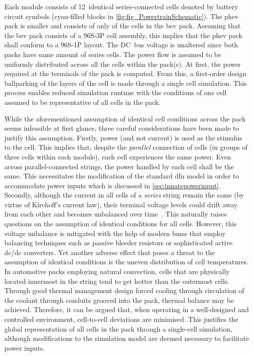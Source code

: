 Each module consists  of 12~identical series-connected cells  denoted by battery
circuit symbols (cyan-filled  blocks in \cref{fig:fig_PowertrainSchematic}). The
\gls{phev} pack is  smaller and consists of only   of the cells in
the \gls{bev} pack. Assuming that the \gls{bev} pack consists of a \mbox{96S-3P}
cell  assembly,  this implies  that  the  \gls{phev}  pack  shall conform  to  a
\mbox{96S-1P} layout. The DC~bus voltage is unaltered since both packs have same
amount of  series cells. The power  flow is assumed to  be uniformly distributed
across all  the cells within  the pack(s). At first,  the power required  at the
terminals of the  pack is computed. From this, a  first-order design ballparking
of the layers of the cell is made through a single cell simulation. This process
enables reduced simulation runtime with the conditions of one cell assumed to be
representative of all cells in the pack.



While the aforementioned assumption of identical cell conditions across the pack
seems infeasible at first glance, three careful considerations have been made to
justify  this assumption.  Firstly,  power  (and not  current)  is  used as  the
stimulus to the cell. This  implies that, despite the \emph{parallel} connection
of cells  (in groups of three  cells within each module),  each cell experiences
the same  power. Even  across parallel-connected strings,  the power  handled by
each cell shall be the same.  This necessitates the modification of the standard
\gls{dfn}  model in  order to  accommodate power  inputs which  is discussed  in
\cref{sec:innatepowerinput}. Secondly,  although the current  in all cells  of a
\emph{series}  string remain  the same  (by virtue  of Kirchoff's  current law),
their  terminal voltage  levels could  drift away  from each  other and  becomes
unbalanced over  time~\cite{Andrea2010}. This naturally raises  questions on the
assumption  of  identical  conditions  for  all  cells.  However,  this  voltage
unbalance is mitigated with the help of modern \glspl{bms} that employ balancing
techniques  such as  passive  bleeder resistors  or  sophisticated active  dc/dc
converters. Yet another adverse effect that  poses a threat to the assumption of
identical  conditions  is  the  uneven distribution  of  cell  temperatures.  In
automotive packs employing natural convection, cells that are physically located
innermost in  the string tend  to get hotter  than the outermost  cells. Through
good thermal management  design \eg{} forced cooling through  circulation of the
coolant through conduits grooved into the pack, thermal balance may be achieved.
Therefore,  it  can be  argued  that,  when  operating  in a  well-designed  and
controlled environment,  cell-to-cell deviations  are minimised.  This justifies
the  global representation  of  all  cells in  the  pack  through a  single-cell
simulation, although modifications to the  simulation model are deemed necessary
to facilitate power inputs.


